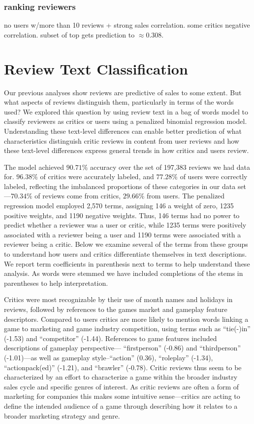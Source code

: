 \documentclass[letterpaper]{article}
\begin{document}
\subsubsection{ranking reviewers}
no users w/more than 10 reviews + strong sales correlation. some critics negative correlation. subset of top gets prediction to $\approx 0.308$.


\section{Review Text Classification}
Our previous analyses show reviews are predictive of sales to some extent. But what aspects of reviews distinguish them, particularly in terms of the words used? We explored this question by using review text in a bag of words model to classify reviewers as critics or users using a penalized binomial regression model. Understanding these text-level differences can enable better prediction of what characteristics distinguish critic reviews in content from user reviews and how these text-level differences express general trends in how critics and users review. 

The model achieved $90.71\%$ accuracy over the set of 197,383 reviews we had data for. $96.38\%$ of critics were accurately labeled, and $77.28\%$ of users were correctly labeled, reflecting the imbalanced proportions of these categories in our data set---$70.34\%$ of reviews come from critics, $29.66\%$ from users. The penalized regression model employed 2,570 terms, assigning 146 a weight of zero, 1235 positive weights, and 1190 negative weights. Thus, 146 terms had no power to predict whether a reviewer was a user or critic, while 1235 terms were positively associated with a reviewer being a user and 1190 terms were associated with a reviewer being a critic. Below we examine several of the terms from these groups to understand how users and critics differentiate themselves in text descriptions. We report term coefficients in parenthesis next to terms to help understand these analysis. As words were stemmed we have included completions of the stems in parentheses to help interpretation.

Critics were most recognizable by their use of month names and holidays in reviews, followed by references to the games market and gameplay feature descriptors. Compared to users critics are more likely to mention words linking a game to marketing and game industry competition, using terms such as ``tie(-)in'' (-1.53) and ``competitor'' (-1.44). References to game features included descriptions of gameplay perspective--- ``firstperson'' (-0.86) and ``thirdperson'' (-1.01)---as well as gameplay style--``action'' (0.36), ``roleplay'' (-1.34),  ``actionpack(ed)'' (-1.21), and ``brawler'' (-0.78). Critic reviews thus seem to be characterized by an effort to characterize a game within the broader industry sales cycle and specific genres of interest. As critic reviews are often a form of marketing for companies this makes some intuitive sense---critics are acting to define the intended audience of a game through describing how it relates to a broader marketing strategy and genre.
\end{document}
